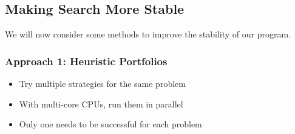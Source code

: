 




\clearpage
\subsection{Making Search More Stable}

We will now consider some methods to improve the stability of our program.

\begin{frame}
\frametitle{Approach 1: Heuristic Portfolios}
\begin{itemize}
\item Try multiple strategies for the same problem
\item With multi-core CPUs, run them in parallel
\item Only one needs to be successful for each problem
\end{itemize}
\end{frame}

